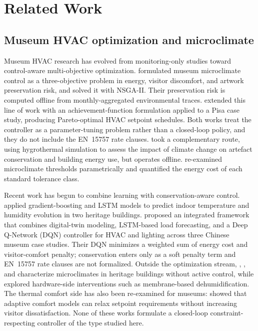 \documentclass[11pt,a4paper]{article}
\begin{document}
\section{Related Work}\label{sec:related}

\subsection{Museum HVAC optimization and microclimate}

Museum HVAC research has evolved from monitoring-only studies toward
control-aware multi-objective optimization. \citet{ascione2018museum}
formulated museum microclimate control as a three-objective problem in
energy, visitor discomfort, and artwork preservation risk, and solved it
with NSGA-II. Their preservation risk is computed offline from
monthly-aggregated environmental traces.
\citet{schito2020museum} extended this line of work with an
achievement-function formulation applied to a Pisa case study, producing
Pareto-optimal HVAC setpoint schedules. Both works treat the controller
as a parameter-tuning problem rather than a closed-loop policy, and they
do not include the EN~15757 rate clauses.
\citet{coelho2020museum} took a complementary route, using hygrothermal
simulation to assess the impact of climate change on artefact
conservation and building energy use, but operates offline. \citet{verticchio2024microclimate} re-examined
microclimate thresholds parametrically and quantified the energy cost of
each standard tolerance class.

Recent work has begun to combine learning with conservation-aware
control. \citet{boesgaard2022heritage} applied gradient-boosting and
LSTM models to predict indoor temperature and humidity evolution in two
heritage buildings. \citet{green_smart_museums_2025} proposed an
integrated framework that combines digital-twin modeling, LSTM-based load
forecasting, and a Deep Q-Network (DQN) controller for HVAC and lighting
across three Chinese museum case studies. Their DQN minimizes a weighted
sum of energy cost and visitor-comfort penalty; conservation enters only
as a soft penalty term and EN~15757 rate clauses are not formalized.
Outside the optimization stream, \citet{museum_no_hvac_2025},
\citet{greek_museum_2024}, and \citet{coherence_heritage_2025}
characterize microclimates in heritage buildings without active control,
while \citet{membrane_dehumid_museum_2025} explored hardware-side
interventions such as membrane-based dehumidification. The thermal
comfort side has also been re-examined for museums:
\citet{mudejar2024adaptive} showed that adaptive comfort models
\citep{ashrae552020,en167982020} can relax setpoint requirements without
increasing visitor dissatisfaction. None of these works formulate a
closed-loop constraint-respecting controller of the type studied here.
\end{document}
